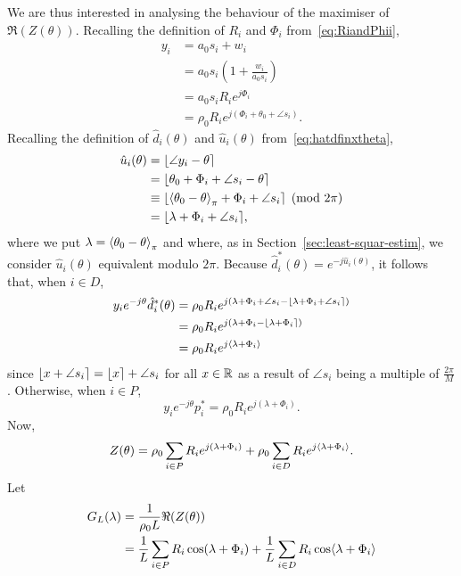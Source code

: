 \documentclass[draftcls, onecolumn, 11pt]{IEEEtran}
\begin{document}
We are thus interested in analysing the behaviour of the maximiser of $\Re(Z(\theta))$.  Recalling the definition of $R_i$ and $\Phi_i$ from~\eqref{eq:RiandPhii},
\begin{align*}
y_i &= a_0 s_i + w_i \\
&= a_0 s_i \left( 1 + \frac{w_i}{a_0 s_i} \right) \\
&= a_0 s_i R_i e^{j \Phi_i} \\
&= \rho_0 R_i e^{j ( \Phi_i + \theta_0 + \angle{s_i}) }.
\end{align*}
Recalling the definition of $\hat{d}_i(\theta)$ and $\hat{u}_i(\theta)$ from~\eqref{eq:hatdfinxtheta},
\begin{align*}
\hat{u}_i(\theta) &= {\left\lfloor \angle{y_i} - \theta \right\rceil} \\
&= {\left\lfloor \theta_0 + \Phi_i + \angle{s_i} - \theta \right\rceil} \\
&\equiv {\left\lfloor  \left\langle \theta_0 - \theta \right\rangle_{\pi} + \Phi_i + \angle{s_i} \right\rceil} \pmod{2\pi} \\
&= {\left\lfloor  \lambda + \Phi_i + \angle{s_i}  \right\rceil},
\end{align*}
where we put $\lambda = \left\langle \theta_0 - \theta \right\rangle_\pi$ and where, as in Section~\ref{sec:least-squar-estim}, we consider $\hat{u}_i(\theta)$ equivalent modulo $2\pi$.  Because $\hat{d}_i^*(\theta) = e^{-j\hat{u}_i(\theta)}$, it follows that, when $i \in D$,
\begin{align}
 y_i e^{-j\theta} \hat{d}_i^*(\theta) &= \rho_0 R_i e^{j(\lambda + \Phi_i + \angle{s_i} - {\left\lfloor \lambda + \Phi_i + \angle{s_i} \right\rceil})} \nonumber \\
&= \rho_0 R_i e^{j(\lambda + \Phi_i - {\left\lfloor \lambda + \Phi_i \right\rceil})} \nonumber  \\
&= \rho_0 R_i e^{j\langle \lambda + \Phi_i \rangle} \label{eq:yethetadhat}
\end{align}
since ${\left\lfloor x + \angle{s_i} \right\rceil} = {\left\lfloor x \right\rceil} + \angle{s_i}$ for all $x \in {\mathbb R}$ as a result of $\angle{s_i}$ being a multiple of $\tfrac{2\pi}{M}$.  Otherwise, when $i \in P$,  
\[
y_i e^{-j\theta} p_i^* = \rho_0 R_i e^{j(\lambda + \Phi_i)}.
\]
Now,
\[
Z(\theta) = \rho_0 \sum_{i \in P} R_i e^{j(\lambda + \Phi_i)} + \rho_0  \sum_{i \in D} R_i e^{j\langle \lambda + \Phi_i \rangle}.
\]
Let 
\begin{align}
G_L(\lambda) &= \frac{1}{\rho_0 L} \Re(Z(\theta)) \label{eq:GLdefn} \\
&= \frac{1}{L} \sum_{i \in P} R_i \cos(\lambda + \Phi_i) + \frac{1}{L} \sum_{i \in D} R_i \cos\langle \lambda + \Phi_i \rangle \nonumber
\end{align}
\end{document}
